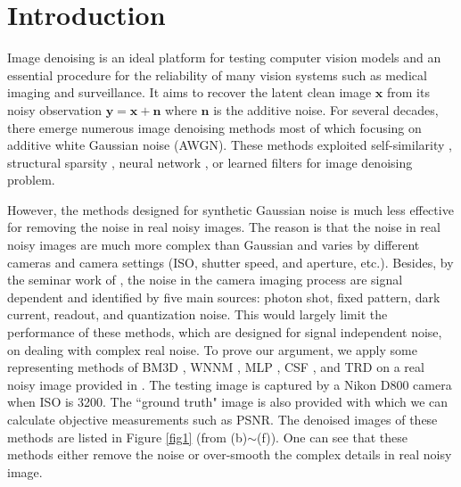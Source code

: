 \documentclass[10pt,twocolumn,letterpaper]{article}
\begin{document}
\section{Introduction} 

Image denoising is an ideal platform for testing computer vision models and an essential procedure for the reliability of many vision systems such as medical imaging and surveillance. It aims to recover the latent clean image $\mathbf{x}$ from its noisy observation $\mathbf{y}=\mathbf{x}+\mathbf{n}$ where $\mathbf{n}$ is the additive noise. For several decades, there emerge numerous image denoising methods \cite{nlm,foe,ksvd,bm3d,cbm3d,lssc,epll,mlp,ncsr,wnnm,csf,pgpd,chen2015learning} most of which focusing on additive white Gaussian noise (AWGN). These methods exploited self-similarity \cite{nlm,epll,wnnm,pgpd}, structural sparsity \cite{ksvd,bm3d,cbm3d,lssc,ncsr}, neural network \cite{mlp}, or learned filters \cite{foe,csf,chen2015learning} for image denoising problem. 

However, the methods designed for synthetic Gaussian noise is much less effective for removing the noise in real noisy images. The reason is that the noise in real noisy images are much more complex than Gaussian \cite{crosschannel2016,healey1994radiometric} and varies by different cameras and camera settings (ISO, shutter speed, and aperture, etc.). Besides, by the seminar work of \cite{healey1994radiometric}, the noise in the camera imaging process \cite{NewInCamera,crosschannel2016} are signal dependent and identified by five main sources: photon shot, fixed pattern, dark current, readout, and quantization noise. This would largely limit the performance of these methods, which are designed for signal independent noise, on dealing with complex real noise. To prove our argument, we apply some representing methods of BM3D \cite{bm3d}, WNNM \cite{wnnm}, MLP \cite{mlp}, CSF \cite{csf}, and TRD \cite{chen2015learning} on a real noisy image provided in \cite{crosschannel2016}. The testing image is captured by a Nikon D800 camera when ISO is 3200. The ``ground truth" image is also provided with which we can calculate objective measurements such as PSNR. The denoised images of these methods are listed in Figure \ref{fig1} (from (b)$\sim$(f)). One can see that these methods either remove the noise or over-smooth the complex details in real noisy image. 
\end{document}
